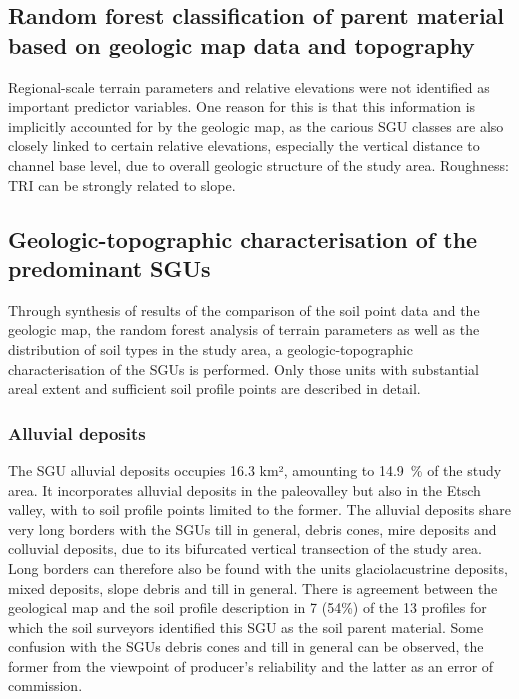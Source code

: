 \documentclass[preprint,12pt,authoryear]{elsarticle}
\begin{document}
\subsection{Random forest classification of parent material based on geologic map data and topography}
Regional-scale terrain parameters and relative elevations were not identified as important predictor variables. One reason for this is that this information is implicitly accounted for by the geologic map, as the carious SGU classes are also closely linked to certain relative elevations, especially the vertical distance to channel base level, due to overall geologic structure of the study area.
Roughness: TRI can be strongly related to slope.

\subsection{Geologic-topographic characterisation of the predominant SGUs}
Through synthesis of results of the comparison of the soil point data and the geologic map, the random forest analysis of terrain parameters as well as the distribution of soil types in the study area, a geologic-topographic characterisation of the  SGUs is performed. Only those units with substantial areal extent and sufficient soil profile points are described in detail.

\subsubsection{Alluvial deposits}
The SGU alluvial deposits occupies 16.3 km², amounting to 14.9~\% of the study area. It incorporates alluvial deposits in the paleovalley but also in the Etsch valley, with to soil profile points limited to the former. The alluvial deposits share very long borders with the SGUs till in general, debris cones, mire deposits and colluvial deposits, due to its bifurcated vertical transection of the study area. Long borders can therefore also be found with the units glaciolacustrine deposits, mixed deposits, slope debris and till in general. There is agreement between the geological map and the soil profile description in 7 (54\%) of the 13 profiles for which the soil surveyors identified this SGU as the soil parent material. Some confusion with the SGUs debris cones and till in general can be observed, the former from the viewpoint of producer's reliability and the latter as an error of commission.  
\end{document}
